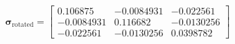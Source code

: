 $$
\boldsymbol\sigma_{\mathrm{rotated}} = \left[\begin{matrix}0.106875 & -0.0084931 & -0.022561\\-0.0084931 & 0.116682 & -0.0130256\\-0.022561 & -0.0130256 & 0.0398782\end{matrix}\right]
$$
